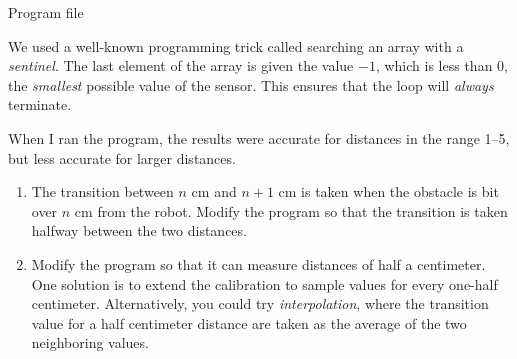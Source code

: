 
{\raggedleft \hfill Program file }

We used a well-known programming trick called searching an array with a
\emph{sentinel}. The last element of the array is given the value $-1$,
which is less than $0$, the \emph{smallest} possible value of the
sensor. This ensures that the loop will \emph{always} terminate.


When I ran the program, the results were accurate for distances in the
range 1--5, but less accurate for larger distances.


\begin{enumerate}

\item The transition between $n$ cm and $n+1$ cm is taken when the
obstacle is bit over $n$ cm from the robot. Modify the program so that
the transition is taken halfway between the two distances.

\item Modify the program so that it can measure distances of half a
centimeter. One solution is to extend the calibration to sample values
for every one-half centimeter. Alternatively, you could try
\emph{interpolation}, where the transition value for a half centimeter
distance are taken as the average of the two neighboring values.

\end{enumerate}
